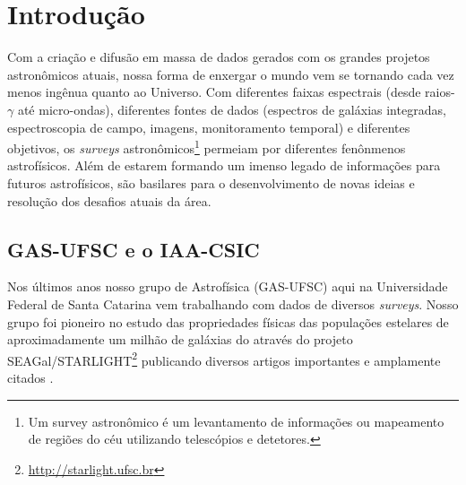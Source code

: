 


\chapter{Introdução}
\label{sec:intro}

Com a criação e difusão em massa de dados gerados com os grandes projetos astronômicos atuais, nossa
forma de enxergar o mundo vem se tornando cada vez menos ingênua quanto ao Universo. Com diferentes
faixas espectrais (desde raios-$\gamma$ até micro-ondas), diferentes fontes de dados (espectros de
galáxias integradas, espectroscopia de campo, imagens, monitoramento temporal) e diferentes
objetivos, os {\em surveys} astronômicos\footnote{Um survey astronômico é um levantamento de
informações ou mapeamento de regiões do céu utilizando telescópios e detetores.} permeiam por
diferentes fenônmenos astrofísicos. Além de estarem formando um imenso legado de informações para
futuros astrofísicos, são basilares para o desenvolvimento de novas ideias e resolução dos desafios
atuais da área.
 
\section{GAS-UFSC e o IAA-CSIC}
\label{sec:intro:UFSCeIAA}

Nos últimos anos nosso grupo de Astrofísica (GAS-UFSC) aqui na Universidade Federal de Santa
Catarina vem trabalhando com dados de diversos {\em surveys}. Nosso grupo foi pioneiro no estudo das
propriedades físicas das populações estelares de aproximadamente um milhão de galáxias do \SDSS
através do projeto
SEAGal/STARLIGHT\footnote{\href{http://starlight.ufsc.br}{http://starlight.ufsc.br}} publicando
diversos artigos importantes e amplamente citados \citep[e.g., ][]{CidFernandes.etal.2005a,
Mateus.etal.2006a, Stasinska.etal.2006a, Asari.etal.2007a, Stasinska.etal.2008a,
CidFernandes.etal.2011a}.

